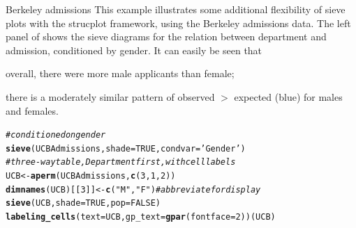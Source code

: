 \documentclass[11pt]{book}\usepackage[]{graphicx}\usepackage[]{color}
\makeatletter
\newcommand{\hlnum}[1]{\textcolor[rgb]{0.686,0.059,0.569}{#1}}%
\newcommand{\hlstr}[1]{\textcolor[rgb]{0.192,0.494,0.8}{#1}}%
\newcommand{\hlcom}[1]{\textcolor[rgb]{0.678,0.584,0.686}{\textit{#1}}}%
\newcommand{\hlstd}[1]{\textcolor[rgb]{0.345,0.345,0.345}{#1}}%
\newcommand{\hlkwb}[1]{\textcolor[rgb]{0.69,0.353,0.396}{#1}}%
\newcommand{\hlkwc}[1]{\textcolor[rgb]{0.333,0.667,0.333}{#1}}%
\newcommand{\hlkwd}[1]{\textcolor[rgb]{0.737,0.353,0.396}{\textbf{#1}}}%
\newenvironment{kframe}{%
 \def\at@end@of@kframe{}%
 \ifinner\ifhmode%
  \def\at@end@of@kframe{\end{minipage}}%
  \begin{minipage}{\columnwidth}%
 \fi\fi%
 \def\FrameCommand##1{\hskip\@totalleftmargin \hskip-\fboxsep
 \colorbox{shadecolor}{##1}\hskip-\fboxsep
     \hskip-\linewidth \hskip-\@totalleftmargin \hskip\columnwidth}%
 \MakeFramed {\advance\hsize-\width
   \@totalleftmargin\z@ \linewidth\hsize
   \@setminipage}}%
 {\par\unskip\endMakeFramed%
 \at@end@of@kframe}
\newenvironment{knitrout}{}{} %
\renewenvironment{knitrout}{\small\renewcommand{\baselinestretch}{.85}}{} %
\makeatother
\begin{document}
\begin{Example}[berkeley3]{Berkeley admissions}
This example illustrates some additional flexibility of sieve plots
with the strucplot framework, using the Berkeley admissions data.
The left panel of  shows the sieve diagrams for
the relation between department and admission, conditioned by gender.
It can easily be seen that 
\begin{seriate}
  \item overall, there were more male applicants than female;
  \item there is a moderately similar pattern of observed $>$ expected (blue)
  for males and females.
\end{seriate}
\begin{knitrout}
\color{fgcolor}\begin{kframe}
\begin{alltt}
\hlcom{# conditioned on gender}
\hlkwd{sieve}\hlstd{(UCBAdmissions,} \hlkwc{shade}\hlstd{=}\hlnum{TRUE}\hlstd{,} \hlkwc{condvar}\hlstd{=}\hlstr{'Gender'}\hlstd{)}
\hlcom{# three-way table, Department first, with cell labels}
\hlstd{UCB} \hlkwb{<-} \hlkwd{aperm}\hlstd{(UCBAdmissions,} \hlkwd{c}\hlstd{(}\hlnum{3}\hlstd{,}\hlnum{1}\hlstd{,}\hlnum{2}\hlstd{))}
\hlkwd{dimnames}\hlstd{(UCB)[[}\hlnum{3}\hlstd{]]} \hlkwb{<-} \hlkwd{c}\hlstd{(}\hlstr{"M"}\hlstd{,} \hlstr{"F"}\hlstd{)}   \hlcom{# abbreviate for display}
\hlkwd{sieve}\hlstd{(UCB,} \hlkwc{shade}\hlstd{=}\hlnum{TRUE}\hlstd{,} \hlkwc{pop}\hlstd{=}\hlnum{FALSE}\hlstd{)}
\hlkwd{labeling_cells}\hlstd{(}\hlkwc{text} \hlstd{= UCB,} \hlkwc{gp_text} \hlstd{=} \hlkwd{gpar}\hlstd{(}\hlkwc{fontface} \hlstd{=} \hlnum{2}\hlstd{))(UCB)}
\end{alltt}
\end{kframe}\begin{figure}[htbp]



\end{figure}
\end{knitrout}
\end{Example}
\end{document}

